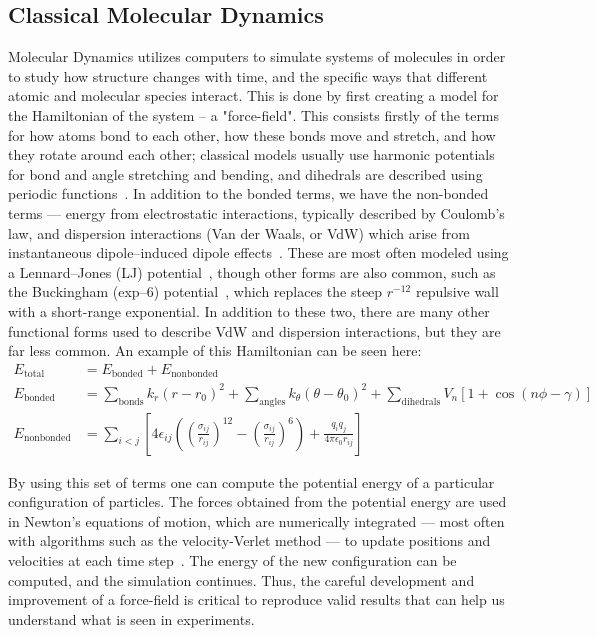 \subsection{Classical Molecular Dynamics}
Molecular Dynamics utilizes computers to simulate systems of molecules in order to study how structure changes
with time, and the specific ways that different atomic and molecular species interact. This is done
by first creating a model for the Hamiltonian of the system -- a "force-field". This consists firstly of the terms for how atoms
bond to each other, how these bonds move and stretch, and how they rotate around each other; classical models
usually use harmonic potentials for bond and angle stretching and bending, and dihedrals 
are described using periodic functions~\cite{gromacsmanual}.
In addition to the bonded terms, we have the non-bonded terms — energy from 
electrostatic interactions, typically described by Coulomb's law, and dispersion 
interactions (Van der Waals, or VdW) which arise from instantaneous dipole–induced dipole effects~\cite{gromacsmanual}. These are 
most often modeled using a Lennard–Jones (LJ) potential~\cite{Jones:1924,gromacsmanual}, though other forms are 
also common, such as the Buckingham (exp–6) potential~\cite{Buckingham:1938,gromacsmanual}, which replaces the steep 
\(r^{-12}\) repulsive wall with a short-range exponential. In addition to these two, there are many other
functional forms used to describe VdW and dispersion interactions, but they are far less common. An example of this Hamiltonian
can be seen here:
\begin{align}
E_{\mathrm{total}} &= E_{\mathrm{bonded}} + E_{\mathrm{nonbonded}} \\
E_{\mathrm{bonded}} &= \sum_{\text{bonds}} k_r (r - r_0)^2
+ \sum_{\text{angles}} k_\theta (\theta - \theta_0)^2
+ \sum_{\text{dihedrals}} V_n \left[ 1 + \cos\left( n\phi - \gamma \right) \right] \\
E_{\mathrm{nonbonded}} &= \sum_{i<j} \left[ 4\epsilon_{ij} \left( \left( \frac{\sigma_{ij}}{r_{ij}} \right)^{12}
- \left( \frac{\sigma_{ij}}{r_{ij}} \right)^{6} \right)
+ \frac{q_i q_j}{4\pi\epsilon_0 r_{ij}} \right]
\end{align}

By using this set of terms one can compute the potential energy of a particular configuration of particles. 
The forces obtained from the potential energy are used in Newton’s equations of motion, 
which are numerically integrated — most often with algorithms such as the velocity-Verlet method — 
to update positions and velocities at each time step~\cite{gromacsmanual}.
The energy of the new configuration
can be computed, and the simulation continues. Thus, the careful development and improvement of a force-field is critical to 
reproduce valid results that can help us understand what is seen in experiments.

